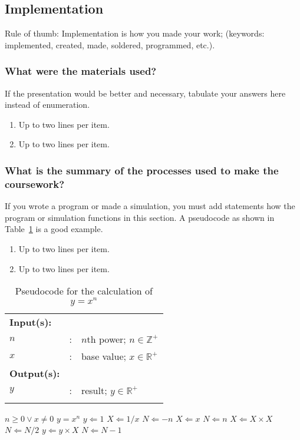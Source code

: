 \subsection{Implementation}
\label{sec:implem}

Rule of thumb: Implementation is how you made your  work; (keywords: implemented, created, made, soldered, programmed, etc.).


\subsubsection{What were the materials used?}
If the presentation would be better and necessary, tabulate your answers here instead of enumeration.
\begin{enumerate}
	\item Up to two lines per item.
	\item Up to two lines per item.
\end{enumerate}


\subsubsection{What is the summary of the processes used to make the coursework?}
If you wrote a program or made a simulation, you must add statements how the program or simulation functions in this section.	A pseudocode as shown in Table~\ref{tab:calcxn} is a good example.
\begin{enumerate}
	\item Up to two lines per item.
	\item Up to two lines per item.
\end{enumerate}

\begin{table}[!b]
	\caption{Pseudocode for the calculation of $y = x^n$}
	\label{tab:calcxn}	
	\centering
	{\footnotesize
		\begin{tabular}{lll}
			\hline
			\hline
			{\bfseries Input(s):} & & \\
			$n$ & : & $n$th power; $n \in \mathbb{Z}^{+}$ \\
			$x$ & : & base value; $x \in \mathbb{R}^{+}$ \\
			\hline
			{\bfseries Output(s):} & & \\
			$y$ & : & result; $y \in \mathbb{R}^{+}$  \\
			\hline
			\hline
			\\
		\end{tabular}
	}
	\begin{algorithmic}[1]
		{\footnotesize
			\REQUIRE $n \geq 0 \vee x \neq 0$
			\ENSURE $y = x^n$
			\STATE $y \Leftarrow 1$
			\STATE $X \Leftarrow 1 / x$
			\STATE $N \Leftarrow -n$
			\ELSE
			\STATE $X \Leftarrow x$
			\STATE $N \Leftarrow n$
			\ENDIF
			\STATE $X \Leftarrow X \times X$
			\STATE $N \Leftarrow N / 2$
			\ELSE[$N$ is odd]
			\STATE $y \Leftarrow y \times X$
			\STATE $N \Leftarrow N - 1$
			\ENDIF
			\ENDWHILE
		}
	\end{algorithmic}
\end{table}







